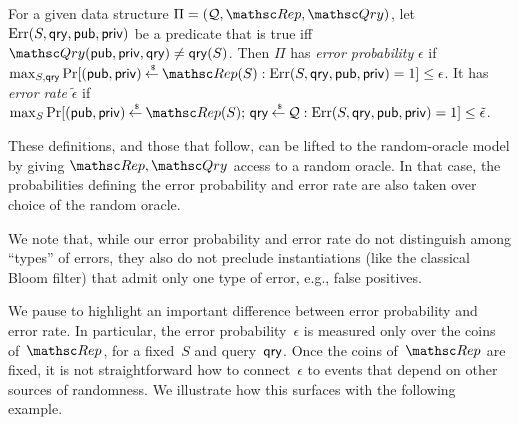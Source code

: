 \begin{definition} \rm
For a given data structure $\setprim=(\calQ,\Rep, \Qry)$, let
$\mathrm{Err}(S,\mathsf{qry},{\sf pub},{\sf priv})$ be a predicate that is true iff
$\Qry(\pubaux,\privaux, \qry) \neq \qry(S)$.  Then $\Pi$ has \emph{error
probability} $\epsilon$ if $\max_{S,\qry}\Pr[(\pubaux,\privaux) \getsr
\Rep(S) : \mathrm{Err}(S,\qry,\pubaux,\privaux)=1 ] \leq \epsilon$.
%
It has \emph{error rate} $\tilde{\epsilon}$ if
$\max_{S}\Pr[(\pubaux,\privaux) \getsr \Rep(S);\, \qry \getsr \calQ :
\mathrm{Err}(S,\qry,\pubaux,\privaux)=1] \leq \tilde{\epsilon}$. \hfill\dqed
\end{definition}


These definitions, and those that follow, can be lifted to the random-oracle
model by giving $\Rep, \Qry$ access to a random oracle. In that
case, the probabilities defining the error probability and error
rate are also taken over choice of the random oracle.

We note that, while our error probability and error rate do not
distinguish among ``types'' of errors, they also do not preclude
instantiations (like the classical Bloom filter) that admit only one
type of error, e.g., false positives.


\def\bin{{\sf Bin}}
We pause to highlight an important
difference between error probability and error rate.  In particular,
the error probability~$\epsilon$ is measured only over the coins
of~$\Rep$, for a fixed~$S$ and query~$\mathsf{qry}$. Once the coins of~$\Rep$
are fixed, it is not straightforward how to connect~$\epsilon$ to
events that depend on other sources of randomness.   We illustrate how
this surfaces with the following example.

